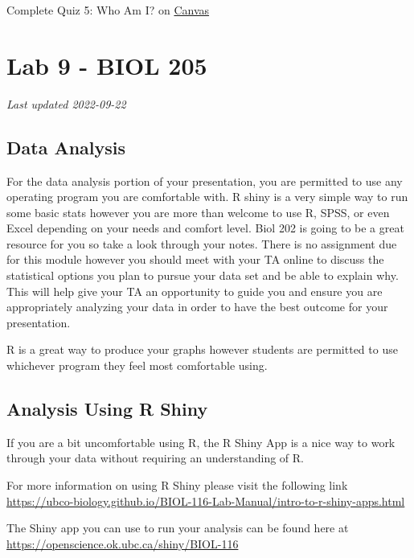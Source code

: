 \documentclass[
]{book}
\begin{document}
Complete Quiz 5: Who Am I? on \href{https://canvas.ubc.ca/courses/113910}{Canvas}

\hypertarget{part-lab-9---biol-205}{%
\part*{Lab 9 - BIOL 205}\label{part-lab-9---biol-205}}

\emph{Last updated 2022-09-22}

\hypertarget{data-analysis}{%
\chapter*{Data Analysis}\label{data-analysis}}

For the data analysis portion of your presentation, you are permitted to use any operating program you are comfortable with. R shiny is a very simple way to run some basic stats however you are more than welcome to use R, SPSS, or even Excel depending on your needs and comfort level. Biol 202 is going to be a great resource for you so take a look through your notes. There is no assignment due for this module however you should meet with your TA online to discuss the statistical options you plan to pursue your data set and be able to explain why. This will help give your TA an opportunity to guide you and ensure you are appropriately analyzing your data in order to have the best outcome for your presentation.

R is a great way to produce your graphs however students are permitted to use whichever program they feel most comfortable using.

\hypertarget{analysis-using-r-shiny}{%
\chapter*{Analysis Using R Shiny}\label{analysis-using-r-shiny}}

If you are a bit uncomfortable using R, the R Shiny App is a nice way to work through your data without requiring an understanding of R.

For more information on using R Shiny please visit the following link \url{https://ubco-biology.github.io/BIOL-116-Lab-Manual/intro-to-r-shiny-apps.html}

The Shiny app you can use to run your analysis can be found here at \url{https://openscience.ok.ubc.ca/shiny/BIOL-116}
\end{document}
